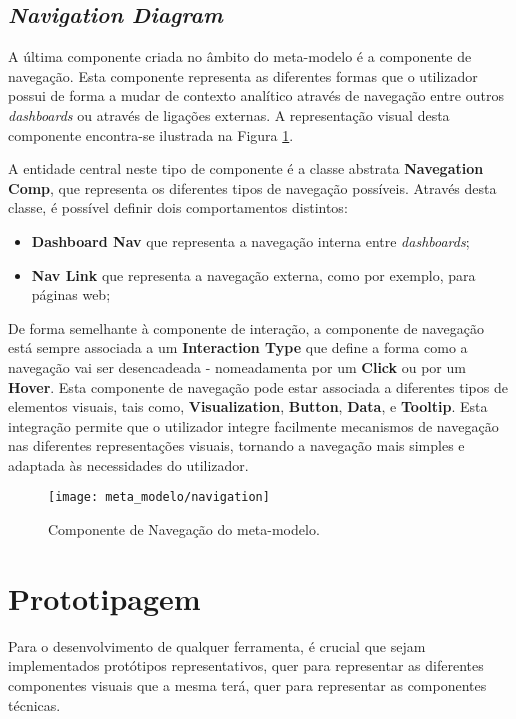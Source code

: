 \subsection{\textit{Navigation Diagram}} %
\label{sub:nav_diagram}

A última componente criada no âmbito do meta-modelo é a componente de navegação. Esta componente representa as diferentes formas que o utilizador possui de forma a mudar de contexto analítico através de navegação entre outros \textit{dashboards} ou através de ligações externas. A representação visual desta componente encontra-se ilustrada na Figura \ref{fig:navigation}.

A entidade central neste tipo de componente é a classe abstrata \textbf{Navegation Comp}, que representa os diferentes tipos de navegação possíveis. Através desta classe, é possível definir dois comportamentos distintos:

\begin{itemize}
    \item \textbf{Dashboard Nav} que representa a navegação interna entre \textit{dashboards};
    \item \textbf{Nav Link} que representa a navegação externa, como por exemplo, para páginas web;
\end{itemize}

De forma semelhante à componente de interação, a componente de navegação está sempre associada a um \textbf{Interaction Type} que define a forma como a navegação vai ser desencadeada - nomeadamenta por um \textbf{Click} ou por um \textbf{Hover}. Esta componente de navegação pode estar associada a diferentes tipos de elementos visuais, tais como, \textbf{Visualization}, \textbf{Button}, \textbf{Data}, e \textbf{Tooltip}. Esta integração permite que o utilizador integre facilmente mecanismos de navegação nas diferentes representações visuais, tornando a navegação mais simples e adaptada às necessidades do utilizador.

\begin{figure}[htbp]
  \texttt{[image: meta\_modelo/navigation]}
  \centering
  \caption{Componente de Navegação do meta-modelo.}
  \label{fig:navigation}
\end{figure}

\section{Prototipagem} %
\label{sec:prototipagem}

Para o desenvolvimento de qualquer ferramenta, é crucial que sejam implementados protótipos representativos, quer para representar as diferentes componentes visuais que a mesma terá, quer para representar as componentes técnicas.

